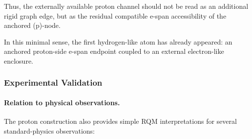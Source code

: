 \documentclass[11pt,a4paper]{article}
\begin{document}
Thus, the externally available proton channel should not be read as an additional rigid graph edge, but as the residual compatible e-span accessibility of the anchored (p)-node.

In this minimal sense, the first hydrogen-like atom has already appeared: an anchored proton-side e-span endpoint coupled to an external electron-like enclosure.



\subsubsection{Experimental Validation}

\paragraph{Relation to physical observations.}

The proton construction also provides simple RQM interpretations for several standard-physics observations:
\end{document}
